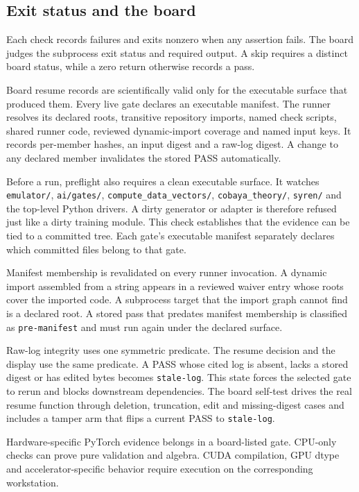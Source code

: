 \documentclass[10pt,aps,prd,twocolumn,nofootinbib]{revtex4-2}
\newcommand{\code}[1]{\texttt{#1}}
\begin{document}
\subsection{Exit status and the board}

Each check records failures and exits nonzero when any assertion fails.  The
board judges the subprocess exit status and required output.  A skip requires a
distinct board status, while a zero return otherwise records a pass.

Board resume records are scientifically valid only for the executable surface
that produced them.  Every live gate declares an executable manifest.  The
runner resolves its declared roots, transitive repository imports, named check
scripts, shared runner code, reviewed dynamic-import coverage and named input
keys.  It records per-member hashes, an input digest and a raw-log digest.  A
change to any declared member invalidates the stored PASS automatically.

Before a run, preflight also requires a clean executable surface.  It watches
\code{emulator/}, \code{ai/gates/}, \code{compute\_data\_vectors/},
\code{cobaya\_theory/}, \code{syren/} and the top-level Python drivers.  A
dirty generator or adapter is therefore refused just like a dirty training
module.  This check establishes that the evidence can be tied to a committed
tree.  Each gate's executable manifest separately declares which committed
files belong to that gate.

Manifest membership is revalidated on every runner invocation.  A dynamic
import assembled from a string appears in a reviewed waiver entry whose roots
cover the imported code.  A subprocess target that the import graph cannot
find is a declared root.  A stored pass that predates manifest membership is
classified as \code{pre-manifest} and must run again under the declared
surface.

Raw-log integrity uses one symmetric predicate.  The resume decision and the
display use the same predicate.  A PASS whose cited log is absent, lacks a
stored digest or has edited bytes becomes \code{stale-log}.  This state forces
the selected gate to rerun and blocks downstream dependencies.  The board self-test
drives the real resume function through deletion, truncation, edit and
missing-digest cases and includes a tamper arm that flips a current PASS to
\code{stale-log}.

Hardware-specific PyTorch evidence belongs in a board-listed gate.  CPU-only
checks can prove pure validation and algebra.  CUDA compilation, GPU dtype
and accelerator-specific behavior require execution on the corresponding
workstation.
\end{document}
